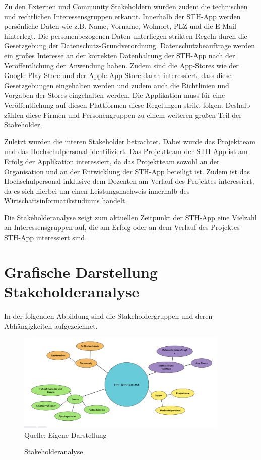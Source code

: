 \noindent
Zu den Externen und Community Stakeholdern wurden zudem die technischen und rechtlichen Interessensgruppen erkannt.
Innerhalb der STH-App werden persönliche Daten wie z.B. Name, Vorname, Wohnort, PLZ und die E-Mail hinterlegt.
Die personenbezogenen Daten unterliegen strikten Regeln durch die Gesetzgebung der Datenschutz-Grundverordnung.
Datenschutzbeauftrage werden ein großes Interesse an der korrekten Datenhaltung der STH-App nach der Veröffentlichung der Anwendung haben.
Zudem sind die App-Stores wie der Google Play Store und der Apple App Store daran interessiert, dass diese Gesetzgebungen eingehalten werden und zudem auch die Richtlinien und Vorgaben der Stores eingehalten werden.
Die Applikation muss für eine Veröffentlichung auf diesen Plattformen diese Regelungen strikt folgen.
Deshalb zählen diese Firmen und Personengruppen zu einem weiteren großen Teil der Stakeholder.

\noindent
Zuletzt wurden die interen Stakeholder betrachtet.
Dabei wurde das Projektteam und das Hochschulpersonal identifiziert.
Das Projektteam der STH-App ist am Erfolg der Applikation interessiert, da das Projektteam sowohl an der Organisation und an der Entwicklung der STH-App beteiligt ist.
Zudem ist das Hochschulpersonal inklusive dem Dozenten am Verlauf des Projektes interessiert, da es sich hierbei um einen Leistungsnachweis innerhalb des Wirtschaftsinformatikstudiums handelt.

\noindent
Die Stakeholderanalyse zeigt zum aktuellen Zeitpunkt der STH-App eine Vielzahl an Interessensgruppen auf, die am Erfolg oder an dem Verlauf des Projektes STH-App interessiert sind.


\section{Grafische Darstellung Stakeholderanalyse}

In der folgenden Abbildung sind die Stakeholdergruppen und deren Abhängigkeiten aufgezeichnet.


\begin{figure}[H]
	\caption[Stakeholderanalyse]{Stakeholderanalyse}
	\includegraphics[width=0.9\textwidth]{assets/figures/Stakeholderanalyse.png}
    \\
	Quelle: Eigene Darstellung
\end{figure}


